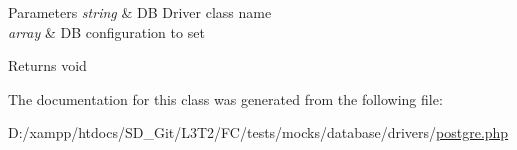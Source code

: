 \begin{DoxyParams}{Parameters}
{\em string} & D\+B Driver class name \\
\hline
{\em array} & D\+B configuration to set \\
\hline
\end{DoxyParams}
\begin{DoxyReturn}{Returns}
void 
\end{DoxyReturn}


The documentation for this class was generated from the following file\+:\begin{DoxyCompactItemize}
\item 
D\+:/xampp/htdocs/\+S\+D\+\_\+\+Git/\+L3\+T2/\+F\+C/tests/mocks/database/drivers/\hyperlink{postgre_8php}{postgre.\+php}\end{DoxyCompactItemize}
